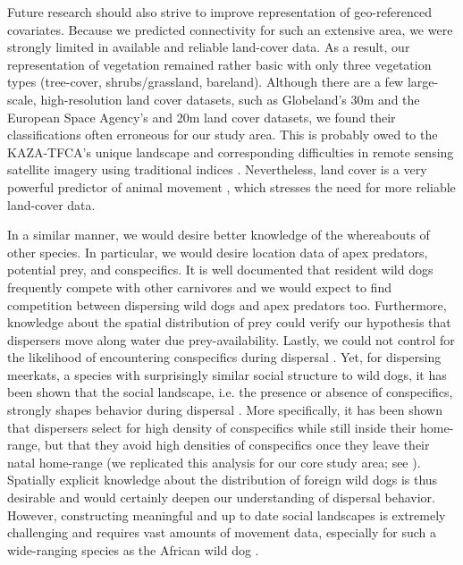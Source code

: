 \documentclass[abstract=on,10pt,a4paper,bibliography=totocnumbered]{scrartcl}
\begin{document}
Future research should also strive to improve representation of geo-referenced
covariates. Because we predicted connectivity for such an extensive area, we
were strongly limited in available and reliable land-cover data. As a result,
our representation of vegetation remained rather basic with only three
vegetation types (tree-cover, shrubs/grassland, bareland). Although there are a
few large-scale, high-resolution land cover datasets, such as Globeland's 30m
\citep{Chen.2015} and the European Space Agency's and 20m \citep{ESA.2019} land
cover datasets, we found their classifications often erroneous for our study
area. This is probably owed to the KAZA-TFCA's unique landscape and
corresponding difficulties in remote sensing satellite imagery using traditional
indices \citep{Wolski.2017}. Nevertheless, land cover is a very powerful
predictor of animal movement \citep{Thurfjell.2014}, which stresses the need for
more reliable land-cover data.

In a similar manner, we would desire better knowledge of the whereabouts of
other species. In particular, we would desire location data of apex predators,
potential prey, and conspecifics. It is well documented that resident wild dogs
frequently compete with other carnivores \citep{Creel.1998} and we would expect
to find competition between dispersing wild dogs and apex predators too.
Furthermore, knowledge about the spatial distribution of prey could verify our
hypothesis that dispersers move along water due prey-availability. Lastly, we
could not control for the likelihood of encountering conspecifics during
dispersal . Yet, for dispersing meerkats, a species with surprisingly similar
social structure to wild dogs, it has been shown that the social landscape, i.e.
the presence or absence of conspecifics, strongly shapes behavior during
dispersal \citep{Cozzi.2018}. More specifically, it has been shown that
dispersers select for high density of conspecifics while still inside their
home-range, but that they avoid high densities of conspecifics once they leave
their natal home-range (we replicated this analysis for our core study area; see
). Spatially explicit knowledge about the
distribution of foreign wild dogs is thus desirable and would certainly deepen
our understanding of dispersal behavior. However, constructing meaningful and up
to date social landscapes is extremely challenging and requires vast amounts of
movement data, especially for such a wide-ranging species as the African wild
dog \citep{Pomilia.2015}.
\end{document}
